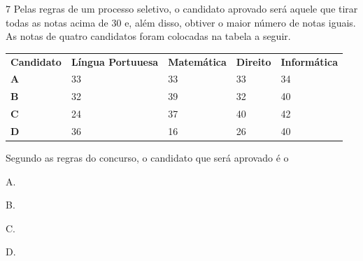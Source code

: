 
\num{7}  Pelas regras de um processo seletivo, o candidato aprovado
será aquele que tirar todas as notas acima de $30$ e, além disso, obtiver o
maior número de notas iguais. As notas de quatro candidatos foram colocadas
na tabela a seguir.

\begin{table}[H]\centering
\begin{tabular}{lllll}
\textbf{Candidato} & \textbf{Língua Portuuesa} & \textbf{Matemática} & \textbf{Direito} & \textbf{Informática} \\
\textbf{A}         & 33                        & 33                  & 33               & 34                   \\
\textbf{B}         & 32                        & 39                  & 32               & 40                   \\
\textbf{C}         & 24                        & 37                  & 40               & 42                   \\
\textbf{D}         & 36                        & 16                  & 26               & 40                  
\end{tabular}
\end{table}

Segundo as regras do concurso, o candidato que será aprovado é o

\begin{escolha}
\item A.
\item B.
\item C.
\item D.
\end{escolha}


